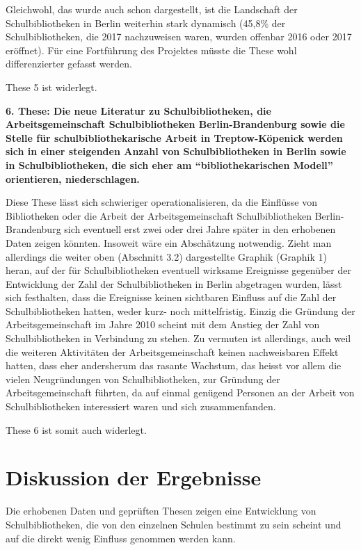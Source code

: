 \documentclass[a4paper,
fontsize=11pt,
oneside,
numbers=noperiodatend,
parskip=half-,
bibliography=totoc,
final
]{scrartcl}
\begin{document}
Gleichwohl, das wurde auch schon dargestellt, ist die Landschaft der
Schulbibliotheken in Berlin weiterhin stark dynamisch (45,8\% der
Schulbibliotheken, die 2017 nachzuweisen waren, wurden offenbar 2016
oder 2017 eröffnet). Für eine Fortführung des Projektes müsste die These
wohl differenzierter gefasst werden.

These 5 ist widerlegt.

\textbf{6. These: Die neue Literatur zu Schulbibliotheken, die
Arbeitsgemeinschaft Schulbibliotheken Berlin-Brandenburg sowie die
Stelle für schulbibliothekarische Arbeit in Treptow-Köpenick werden sich
in einer steigenden Anzahl von Schulbibliotheken in Berlin sowie in
Schulbibliotheken, die sich eher am \enquote{bibliothekarischen Modell}
orientieren, niederschlagen.}

Diese These lässt sich schwieriger operationalisieren, da die Einflüsse
von Bibliotheken oder die Arbeit der Arbeitsgemeinschaft
Schulbibliotheken Berlin-Brandenburg sich eventuell erst zwei oder drei
Jahre später in den erhobenen Daten zeigen könnten. Insoweit wäre ein
Abschätzung notwendig. Zieht man allerdings die weiter oben (Abschnitt
3.2) dargestellte Graphik (Graphik 1) heran, auf der für
Schulbibliotheken eventuell wirksame Ereignisse gegenüber der
Entwicklung der Zahl der Schulbibliotheken in Berlin abgetragen wurden,
lässt sich festhalten, dass die Ereignisse keinen sichtbaren Einfluss
auf die Zahl der Schulbibliotheken hatten, weder kurz- noch
mittelfristig. Einzig die Gründung der Arbeitsgemeinschaft im Jahre 2010
scheint mit dem Anstieg der Zahl von Schulbibliotheken in Verbindung zu
stehen. Zu vermuten ist allerdings, auch weil die weiteren Aktivitäten
der Arbeitsgemeinschaft keinen nachweisbaren Effekt hatten, dass eher
andersherum das rasante Wachstum, das heisst vor allem die vielen
Neugründungen von Schulbibliotheken, zur Gründung der
Arbeitsgemeinschaft führten, da auf einmal genügend Personen an der
Arbeit von Schulbibliotheken interessiert waren und sich zusammenfanden.

These 6 ist somit auch widerlegt.

\section{Diskussion der
Ergebnisse}\label{diskussion-der-ergebnisse}

Die erhobenen Daten und geprüften Thesen zeigen eine Entwicklung von
Schulbibliotheken, die von den einzelnen Schulen bestimmt zu sein
scheint und auf die direkt wenig Einfluss genommen werden kann.
\end{document}
